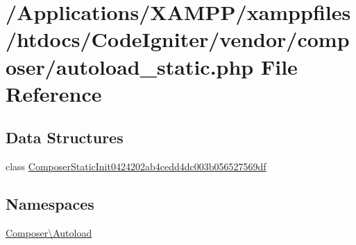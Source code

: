 \hypertarget{autoload__static_8php}{}\section{/\+Applications/\+X\+A\+M\+P\+P/xamppfiles/htdocs/\+Code\+Igniter/vendor/composer/autoload\+\_\+static.php File Reference}
\label{autoload__static_8php}
\subsection*{Data Structures}
\begin{DoxyCompactItemize}
\item 
class \mbox{\hyperlink{class_composer_1_1_autoload_1_1_composer_static_init0424202ab4cedd4dc003b056527569df}{Composer\+Static\+Init0424202ab4cedd4dc003b056527569df}}
\end{DoxyCompactItemize}
\subsection*{Namespaces}
\begin{DoxyCompactItemize}
\item 
 \mbox{\hyperlink{namespace_composer_1_1_autoload}{Composer\textbackslash{}\+Autoload}}
\end{DoxyCompactItemize}
